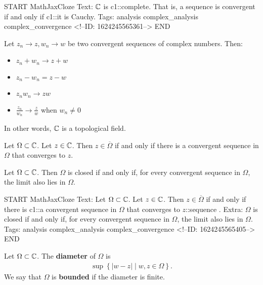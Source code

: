 \documentclass{memoir}
\begin{document}
\begin{anki}
START
MathJaxCloze
Text: \(\mathbb{C}\) is {{c1::complete}}. That is, a sequence is convergent if and only if {{c1::it is Cauchy}}.
Tags: analysis complex_analysis complex_convergence
<!--ID: 1624245565361-->
END
\end{anki}


\begin{prop}
	Let \(z_n\to z,w_n\to w\) be two convergent sequences of complex numbers. Then:
	\begin{itemize}
		\item \(z_n+w_n \to z+w\) 
		\item \(z_n - w_n = z-w\)
		\item \(z_nw_n \to zw\) 
		\item \(\frac{z_n}{w_n} \to \frac{z}{w}\) when \(w_n\neq 0\)
	\end{itemize}
	In other words, \(\mathbb{C}\) is a topological field.
\end{prop}

\begin{prop}
	Let \(\Omega\subset \mathbb{C}\). Let \(z \in \mathbb{C}\). Then \(z \in \overline{\Omega}\) if and only if there is a convergent sequence in \(\Omega\) that converges to \(z\).
\end{prop}

\begin{cor}
	Let \(\Omega\subset \mathbb{C}\). Then \(\Omega\) is closed if and only if, for every convergent sequence in \(\Omega\), the limit also lies in \(\Omega\).
\end{cor}

\begin{anki}
START
MathJaxCloze
Text: Let \(\Omega\subset \mathbb{C}\). Let \(z \in \mathbb{C}\). Then \(z \in \overline{\Omega}\) if and only if there is {{c1::a convergent sequence in \(\Omega\) that converges to \(z\)::sequence}} .
Extra: \(\Omega\) is closed if and only if, for every convergent sequence in \(\Omega\), the limit also lies in \(\Omega\).
Tags: analysis complex_analysis complex_convergence
<!--ID: 1624245565405-->
END
\end{anki}


\begin{defn}
	Let \(\Omega\subset \mathbb{C}\). The \textbf{diameter} of \(\Omega\) is
	\begin{align*}
		\sup \left\{\left| w-z \right|  \mid w,z \in \Omega \right\} .
	\end{align*}
	We say that \(\Omega\) is \textbf{bounded} if the diameter is finite.
\end{defn}
\end{document}
